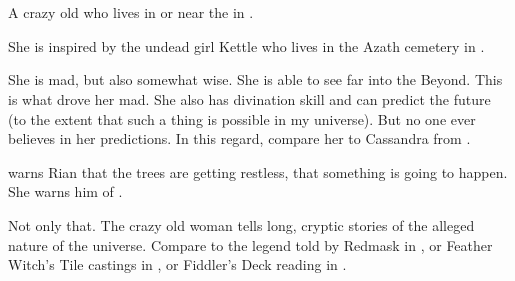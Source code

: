 \chapter[Meccara]{\Meccara}















\section{\Uswa}
\index{\Uswa}
A crazy old \meccaran{} who lives in or near the  in \Malcur. 

She is inspired by the undead girl Kettle who lives in the Azath cemetery in \cite{StevenErikson:MidnightTides}. 

She is mad, but also somewhat wise. She is able to see far into the Beyond. This is what drove her mad. She also has divination skill and can predict the future (to the extent that such a thing is possible in my universe). But no one ever believes in her predictions. In this regard, compare her to Cassandra from .

\Uswa warns Rian that the trees are getting restless, that something is going to happen. She warns him of .


Not only that. 
The crazy old woman tells long, cryptic stories of the alleged nature of the universe. Compare to the legend told by Redmask in \cite[p.340]{StevenErikson:ReapersGale}, or Feather Witch's Tile castings in \cite{StevenErikson:MidnightTides}, or Fiddler's Deck reading in \cite{StevenErikson:TheBonehunters}.














